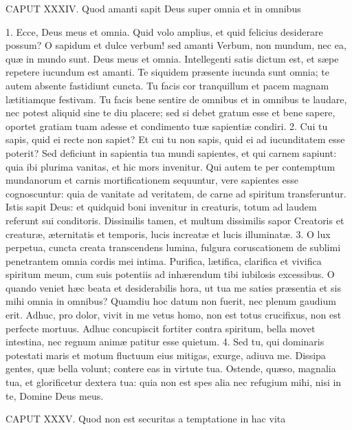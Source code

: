 \documentclass[twoside]{article}
\begin{document}
CAPUT XXXIV.
Quod amanti sapit Deus super omnia et in omnibus

1. Ecce, Deus meus et omnia. Quid volo amplius, et quid felicius desiderare possum? O sapidum et dulce verbum! sed amanti Verbum, non mundum, nec ea, quæ in mundo sunt. Deus meus et omnia. Intellegenti satis dictum est, et sæpe repetere iucundum est amanti. Te siquidem præsente iucunda sunt omnia; te autem absente fastidiunt cuncta. Tu facis cor tranquillum et pacem magnam lætitiamque festivam. Tu facis bene sentire de omnibus et in omnibus te laudare, nec potest aliquid sine te diu placere; sed si debet gratum esse et bene sapere, oportet gratiam tuam adesse et condimento tuæ sapientiæ condiri.
2. Cui tu sapis, quid ei recte non sapiet? Et cui tu non sapis, quid ei ad iucunditatem esse poterit? Sed deficiunt in sapientia tua mundi sapientes, et qui carnem sapiunt: quia ibi plurima vanitas, et hic mors invenitur. Qui autem te per contemptum mundanorum et carnis mortificationem sequuntur, vere sapientes esse cognoscuntur: quia de vanitate ad veritatem, de carne ad spiritum transferuntur. Istis sapit Deus: et quidquid boni invenitur in creaturis, totum ad laudem referunt sui conditoris. Dissimilis tamen, et multum dissimilis sapor Creatoris et creaturæ, æternitatis et temporis, lucis increatæ et lucis illuminatæ.
3. O lux perpetua, cuncta creata transcendens lumina, fulgura coruscationem de sublimi penetrantem omnia cordis mei intima. Purifica, lætifica, clarifica et vivifica spiritum meum, cum suis potentiis ad inhærendum tibi iubilosis excessibus. O quando veniet hæc beata et desiderabilis hora, ut tua me saties præsentia et sis mihi omnia in omnibus? Quamdiu hoc datum non fuerit, nec plenum gaudium erit. Adhuc, pro dolor, vivit in me vetus homo, non est totus crucifixus, non est perfecte mortuus. Adhuc concupiscit fortiter contra spiritum, bella movet intestina, nec regnum animæ patitur esse quietum.
4. Sed tu, qui dominaris potestati maris et motum fluctuum eius mitigas, exurge, adiuva me. Dissipa gentes, quæ bella volunt; contere eas in virtute tua. Ostende, quæso, magnalia tua, et glorificetur dextera tua: quia non est spes alia nec refugium mihi, nisi in te, Domine Deus meus.


CAPUT XXXV.
Quod non est securitas a temptatione in hac vita
\end{document}
